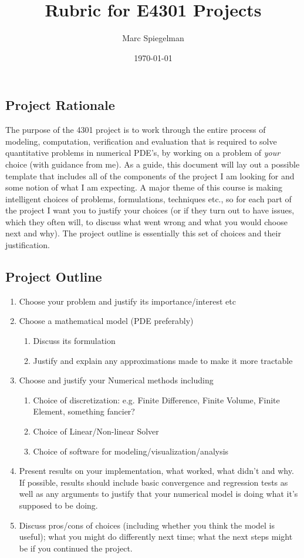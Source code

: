 \documentclass[12pt]{article}
\title{Rubric for E4301 Projects}
\date{\today}
\author{Marc Spiegelman}
\begin{document}
\maketitle{}

\subsection*{Project Rationale}
\label{sec:project-rationale}

The purpose of the 4301 project is to  work through the entire process of
modeling, computation, verification and evaluation that is required to
solve quantitative problems in numerical PDE's, by working on a
problem of \emph{your} choice (with guidance from me).  As a guide, this
document will lay out a possible template that includes all of the
components of the project I am looking for and some notion of what I
am expecting.  A major theme of this course is making intelligent
choices of problems, formulations, techniques etc.,  so for each part of the
project I want you to justify your choices (or if they turn out to
have issues, which they often will, to discuss what went wrong and
what you would choose next and why).  The project outline is
essentially this set of choices and their justification.  

\subsection*{Project Outline}
\label{sec:project-outline}

\begin{enumerate}
\item Choose your problem and justify its importance/interest etc
\item Choose a mathematical model (PDE preferably)
  \begin{enumerate}
  \item Discuss its formulation
  \item Justify and explain any approximations made to make it more tractable
  \end{enumerate}
\item Choose and justify your Numerical methods including
  \begin{enumerate}
  \item Choice of discretization: e.g. Finite Difference, Finite
    Volume, Finite Element, something fancier?
  \item Choice of Linear/Non-linear Solver
  \item Choice of software for modeling/visualization/analysis
  \end{enumerate}
\item Present results on your implementation, what worked, what didn't
  and why. If possible, results should include basic convergence and
  regression tests as well as any arguments to justify that your
  numerical model is doing what it's supposed to be doing.
\item Discuss pros/cons of choices (including whether you think the
  model is useful);  what you might do differently next
  time; what the next steps might be if you continued the project.
\end{enumerate}
\end{document}

